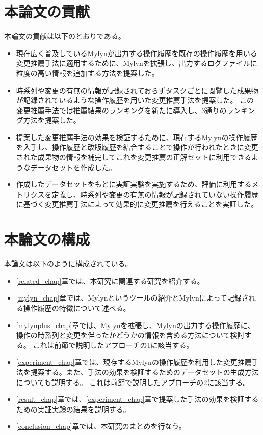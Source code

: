 \documentclass[a4paper]{jsbook}
\begin{document}
\section{本論文の貢献}
本論文の貢献は以下のとおりである。
\begin{itemize}
  \item 現在広く普及しているMylynが出力する操作履歴を既存の操作履歴を用いる変更推薦手法に適用するために、Mylynを拡張し、出力するログファイルに粒度の高い情報を追加する方法を提案した。
  \item 時系列や変更の有無の情報が記録されておらずタスクごとに閲覧した成果物が記録されているような操作履歴を用いた変更推薦手法を提案した。
    この変更推薦手法では推薦結果のランキングを新たに導入し、3通りのランキング方法を提案した。
  \item 提案した変更推薦手法の効果を検証するために、現存するMylynの操作履歴を入手し、操作履歴と改版履歴を結合することで操作が行われたときに変更された成果物の情報を補完してこれを変更推薦の正解セットに利用できるようなデータセットを作成した。
  \item 作成したデータセットをもとに実証実験を実施するため、評価に利用するメトリクスを定義し、時系列や変更の有無の情報が記録されていない操作履歴に基づく変更推薦手法によって効果的に変更推薦を行えることを実証した。
\end{itemize}

\section{本論文の構成}
本論文は以下のように構成されている。

\begin{itemize}
  \item \ref{related_chap}章では、本研究に関連する研究を紹介する。
  \item \ref{mylyn_chap}章では、Mylynというツールの紹介とMylynによって記録される操作履歴の特徴について述べる。
  \item \ref{mylynplus_chap}章では、Mylynを拡張し、Mylynの出力する操作履歴に、操作の時系列と変更を伴ったかどうかの情報を含める方法について検討する。
    これは前節で説明したアプローチの1に該当する。
  \item \ref{experiment_chap}章では、現存するMylynの操作履歴を利用した変更推薦手法を提案する。また、手法の効果を検証するためのデータセットの生成方法についても説明する。
    これは前節で説明したアプローチの2に該当する。
  \item \ref{result_chap}章では、\ref{experiment_chap}章で提案した手法の効果を検証するための実証実験の結果を説明する。
  \item \ref{conclusion_chap}章では、本研究のまとめを行なう。
\end{itemize}
\end{document}
